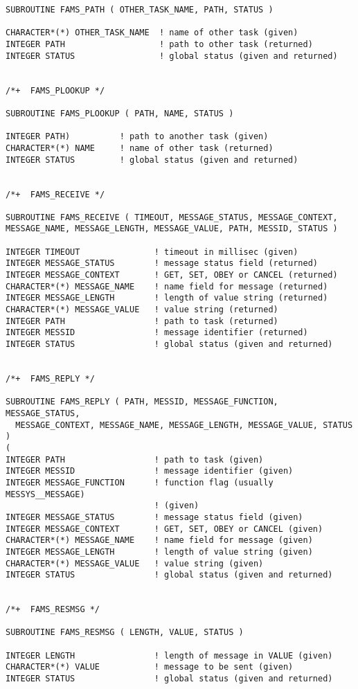 \begin{verbatim}
SUBROUTINE FAMS_PATH ( OTHER_TASK_NAME, PATH, STATUS )

CHARACTER*(*) OTHER_TASK_NAME  ! name of other task (given)
INTEGER PATH                   ! path to other task (returned)
INTEGER STATUS                 ! global status (given and returned)    


/*+  FAMS_PLOOKUP */

SUBROUTINE FAMS_PLOOKUP ( PATH, NAME, STATUS )

INTEGER PATH)          ! path to another task (given)
CHARACTER*(*) NAME     ! name of other task (returned)
INTEGER STATUS         ! global status (given and returned)    


/*+  FAMS_RECEIVE */

SUBROUTINE FAMS_RECEIVE ( TIMEOUT, MESSAGE_STATUS, MESSAGE_CONTEXT,
MESSAGE_NAME, MESSAGE_LENGTH, MESSAGE_VALUE, PATH, MESSID, STATUS )

INTEGER TIMEOUT               ! timeout in millisec (given)
INTEGER MESSAGE_STATUS        ! message status field (returned)
INTEGER MESSAGE_CONTEXT       ! GET, SET, OBEY or CANCEL (returned)
CHARACTER*(*) MESSAGE_NAME    ! name field for message (returned)
INTEGER MESSAGE_LENGTH        ! length of value string (returned)
CHARACTER*(*) MESSAGE_VALUE   ! value string (returned)
INTEGER PATH                  ! path to task (returned)
INTEGER MESSID                ! message identifier (returned)
INTEGER STATUS                ! global status (given and returned)    


/*+  FAMS_REPLY */

SUBROUTINE FAMS_REPLY ( PATH, MESSID, MESSAGE_FUNCTION, MESSAGE_STATUS,
  MESSAGE_CONTEXT, MESSAGE_NAME, MESSAGE_LENGTH, MESSAGE_VALUE, STATUS )
(
INTEGER PATH                  ! path to task (given)
INTEGER MESSID                ! message identifier (given)
INTEGER MESSAGE_FUNCTION      ! function flag (usually MESSYS__MESSAGE)
                              ! (given)
INTEGER MESSAGE_STATUS        ! message status field (given)
INTEGER MESSAGE_CONTEXT       ! GET, SET, OBEY or CANCEL (given)
CHARACTER*(*) MESSAGE_NAME    ! name field for message (given)
INTEGER MESSAGE_LENGTH        ! length of value string (given)
CHARACTER*(*) MESSAGE_VALUE   ! value string (given)
INTEGER STATUS                ! global status (given and returned)    


/*+  FAMS_RESMSG */

SUBROUTINE FAMS_RESMSG ( LENGTH, VALUE, STATUS )

INTEGER LENGTH                ! length of message in VALUE (given)
CHARACTER*(*) VALUE           ! message to be sent (given)
INTEGER STATUS                ! global status (given and returned)    



\end{verbatim}
